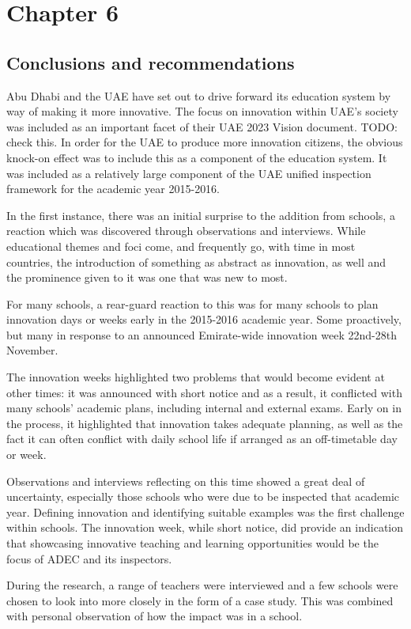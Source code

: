 \section{Chapter 6}
\subsection{Conclusions and recommendations}
Abu Dhabi and the UAE have set out to drive forward its education system by way of making it more innovative. The focus on innovation within UAE’s society was included as an important facet of their UAE 2023 Vision document. TODO: check this. In order for the UAE to produce more innovation citizens, the obvious knock-on effect was to include this as a component of the education system. It was included as a relatively large component of the UAE unified inspection framework for the academic year 2015-2016.

In the first instance, there was an initial surprise to the addition from schools, a reaction which was discovered through observations and interviews. While educational themes and foci come, and frequently go, with time in most countries, the introduction of something as abstract as innovation, as well and the prominence given to it was one that was new to most.

For many schools, a rear-guard reaction to this was for many schools to plan innovation days or weeks early in the 2015-2016 academic year. Some proactively, but many in response to an announced Emirate-wide innovation week 22nd-28th November. 

The innovation weeks highlighted two problems that would become evident at other times: it was announced with short notice and as a result, it conflicted with many schools’ academic plans, including internal and external exams.
Early on in the process, it highlighted that innovation takes adequate planning, as well as the fact it can often conflict with daily school life if arranged as an off-timetable day or week.

Observations and interviews reflecting on this time showed a great deal of uncertainty, especially those schools who were due to be inspected that academic year. Defining innovation and identifying suitable examples was the first challenge within schools. The innovation week, while short notice, did provide an indication that showcasing innovative teaching and learning opportunities would be the focus of ADEC and its inspectors.

During the research, a range of teachers were interviewed and a few schools were chosen to look into more closely in the form of a case study. This was combined with personal observation of how the impact was in a school.

